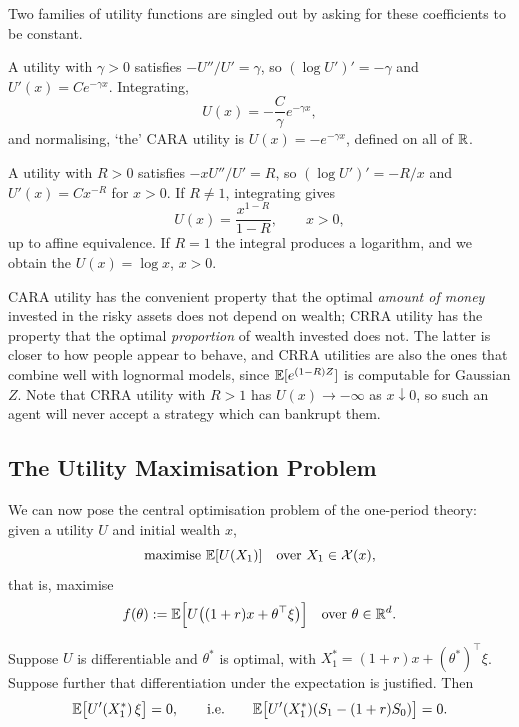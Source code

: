 \documentclass[a4paper]{scrartcl}
\begin{document}
Two families of utility functions are singled out by asking for these coefficients to be constant.

\begin{example}
	A utility with  $\gamma > 0$ satisfies $-U''/U' = \gamma$, so $(\log U')' = -\gamma$ and $U'(x) = Ce^{-\gamma x}$. Integrating,
	$$
	U(x) = -\frac{C}{\gamma}e^{-\gamma x},
	$$
	and normalising, `the' CARA utility is $U(x) = -e^{-\gamma x}$, defined on all of $\mathbb{R}$.
\end{example}

\begin{example}
	A utility with  $R > 0$ satisfies $-xU''/U' = R$, so $(\log U')' = -R/x$ and $U'(x) = Cx^{-R}$ for $x > 0$. If $R \neq 1$, integrating gives
	$$
	U(x) = \frac{x^{1-R}}{1-R}, \qquad x > 0,
	$$
	up to affine equivalence. If $R = 1$ the integral produces a logarithm, and we obtain the  $U(x) = \log x$, $x > 0$.
\end{example}

\begin{remark}
	CARA utility has the convenient property that the optimal \emph{amount of money} invested in the risky assets does not depend on wealth; CRRA utility has the property that the optimal \emph{proportion} of wealth invested does not. The latter is closer to how people appear to behave, and CRRA utilities are also the ones that combine well with lognormal models, since $\mathbb{E}[e^{(1-R)Z}]$ is computable for Gaussian $Z$. Note that CRRA utility with $R > 1$ has $U(x) \to -\infty$ as $x \downarrow 0$, so such an agent will never accept a strategy which can bankrupt them.
\end{remark}

\subsection{The Utility Maximisation Problem}

We can now pose the central optimisation problem of the one-period theory: given a utility $U$ and initial wealth $x$,
$$
\text{maximise } \mathbb{E}[U(X_1)] \quad \text{over } X_1 \in \mathcal{X}(x),
$$
that is, maximise
$$
f(\theta) := \mathbb{E}\Big[U\big((1+r)x + \theta^\top \xi\big)\Big] \quad \text{over } \theta \in \mathbb{R}^d.
$$

\begin{theorem}\label{sfm-thm:foc}
	Suppose $U$ is differentiable and $\theta^*$ is optimal, with $X_1^* = (1+r)x + (\theta^*)^\top\xi$. Suppose further that differentiation under the expectation is justified. Then
	$$
	\mathbb{E}\big[U'(X_1^*)\,\xi\big] = 0, \qquad \text{i.e.} \qquad \mathbb{E}\big[U'(X_1^*)(S_1 - (1+r)S_0)\big] = 0.
	$$
\end{theorem}
\end{document}
